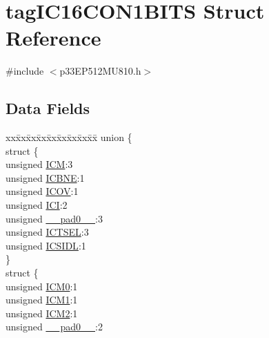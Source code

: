 \hypertarget{structtag_i_c16_c_o_n1_b_i_t_s}{}\section{tag\+I\+C16\+C\+O\+N1\+B\+I\+TS Struct Reference}
\label{structtag_i_c16_c_o_n1_b_i_t_s}


{\ttfamily \#include $<$p33\+E\+P512\+M\+U810.\+h$>$}

\subsection*{Data Fields}
\begin{DoxyCompactItemize}
\item 
\begin{tabbing}
xx\=xx\=xx\=xx\=xx\=xx\=xx\=xx\=xx\=\kill
union \{\\
\>struct \{\\
\>\>unsigned \hyperlink{structtag_i_c16_c_o_n1_b_i_t_s_ad3edde44ecb2d349ffa2decd0a251c20}{ICM}:3\\
\>\>unsigned \hyperlink{structtag_i_c16_c_o_n1_b_i_t_s_a824e7dcca83939e1b049d63ffcee33e9}{ICBNE}:1\\
\>\>unsigned \hyperlink{structtag_i_c16_c_o_n1_b_i_t_s_a49392949376ba0bf58cf8db889e86c94}{ICOV}:1\\
\>\>unsigned \hyperlink{structtag_i_c16_c_o_n1_b_i_t_s_a72486dcb868aad2d5c978494691356cc}{ICI}:2\\
\>\>unsigned \hyperlink{structtag_i_c16_c_o_n1_b_i_t_s_adf71f3d8410c1f1dbbc96680a92c49af}{\_\_pad0\_\_}:3\\
\>\>unsigned \hyperlink{structtag_i_c16_c_o_n1_b_i_t_s_a7a9dd41b5f93eb620df7fa336e452677}{ICTSEL}:3\\
\>\>unsigned \hyperlink{structtag_i_c16_c_o_n1_b_i_t_s_af441b36127c0bb7a35162dfc9a64103c}{ICSIDL}:1\\
\>\} \\
\>struct \{\\
\>\>unsigned \hyperlink{structtag_i_c16_c_o_n1_b_i_t_s_a649b1dd9bca75e558f37a9f52a829bd4}{ICM0}:1\\
\>\>unsigned \hyperlink{structtag_i_c16_c_o_n1_b_i_t_s_af3fe77ef9f8ca41ff11519f445e7bc77}{ICM1}:1\\
\>\>unsigned \hyperlink{structtag_i_c16_c_o_n1_b_i_t_s_a3c62c9cbbc3a406402126c932b709db8}{ICM2}:1\\
\>\>unsigned \hyperlink{structtag_i_c16_c_o_n1_b_i_t_s_adf71f3d8410c1f1dbbc96680a92c49af}{\_\_pad0\_\_}:2\\

\end{tabbing}
\end{DoxyCompactItemize}
